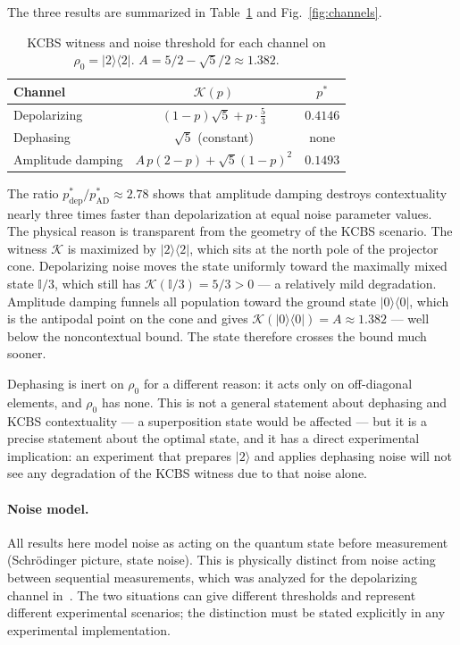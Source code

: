 \documentclass[twocolumn,showpacs,preprintnumbers,amsmath,amssymb,prl]{revtex4-2}
\newcommand{\ket}[1]{|#1\rangle}
\newcommand{\bra}[1]{\langle #1|}
\newcommand{\K}{\mathcal{K}}          %
\newcommand{\pstar}{p^{*}}            %
\newcommand{\Id}{\mathbb{I}}          %
\begin{document}
The three results are summarized in Table~\ref{tab:thresholds} and
Fig.~\ref{fig:channels}.

\begin{table}[h]
  \centering
  \begin{tabular}{lcc}
    \hline\hline
    Channel & $\K(p)$ & $\pstar$ \\
    \hline
    Depolarizing     & $(1-p)\sqrt{5} + p\cdot\tfrac{5}{3}$          & $0.4146$ \\
    Dephasing        & $\sqrt{5}$ (constant)                          & none     \\
    Amplitude damping & $A\,p(2-p)+\sqrt{5}(1-p)^2$                  & $0.1493$ \\
    \hline\hline
  \end{tabular}
  \caption{KCBS witness and noise threshold for each channel on $\rho_0 = \ket{2}\bra{2}$.
           $A = 5/2 - \sqrt{5}/2 \approx 1.382$.}
  \label{tab:thresholds}
\end{table}

The ratio $\pstar_{\mathrm{dep}}/\pstar_{\mathrm{AD}} \approx 2.78$ shows that
amplitude damping destroys contextuality nearly three times faster than
depolarization at equal noise parameter values.
The physical reason is transparent from the geometry of the KCBS scenario.
The witness $\K$ is maximized by $\ket{2}\bra{2}$, which sits at the north pole
of the projector cone.
Depolarizing noise moves the state uniformly toward the maximally mixed state
$\Id/3$, which still has $\K(\Id/3) = 5/3 > 0$ --- a relatively mild
degradation.
Amplitude damping funnels all population toward the ground state $\ket{0}\bra{0}$,
which is the antipodal point on the cone and gives $\K(\ket{0}\bra{0}) = A \approx
1.382$ --- well below the noncontextual bound.
The state therefore crosses the bound much sooner.

Dephasing is inert on $\rho_0$ for a different reason: it acts only on
off-diagonal elements, and $\rho_0$ has none.
This is not a general statement about dephasing and KCBS contextuality --- a
superposition state would be affected --- but it is a precise statement about
the optimal state, and it has a direct experimental implication: an experiment
that prepares $\ket{2}$ and applies dephasing noise will not see any degradation
of the KCBS witness due to that noise alone.

\paragraph{Noise model.}
All results here model noise as acting on the quantum state before measurement
(Schr\"{o}dinger picture, state noise).
This is physically distinct from noise acting between sequential measurements,
which was analyzed for the depolarizing channel in~\cite{Dutra2026}.
The two situations can give different thresholds and represent different
experimental scenarios; the distinction must be stated explicitly in any
experimental implementation.
\end{document}
